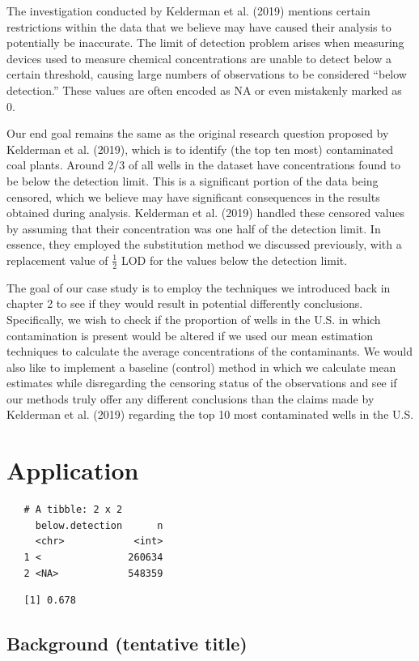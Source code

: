 \documentclass[12pt, twoside]{amherstthesis}
\begin{document}
The investigation conducted by Kelderman et al. (2019) mentions certain restrictions within the data that we believe may have caused their analysis to potentially be inaccurate. The limit of detection problem arises when measuring devices used to measure chemical concentrations are unable to detect below a certain threshold, causing large numbers of observations to be considered ``below detection.'' These values are often encoded as NA or even mistakenly marked as 0.

Our end goal remains the same as the original research question proposed by Kelderman et al. (2019), which is to identify (the top ten most) contaminated coal plants. Around 2/3 of all wells in the dataset have concentrations found to be below the detection limit. This is a significant portion of the data being censored, which we believe may have significant consequences in the results obtained during analysis. Kelderman et al. (2019) handled these censored values by assuming that their concentration was one half of the detection limit. In essence, they employed the substitution method we discussed previously, with a replacement value of \(\frac{1}{2}\) LOD for the values below the detection limit.

The goal of our case study is to employ the techniques we introduced back in chapter 2 to see if they would result in potential differently conclusions. Specifically, we wish to check if the proportion of wells in the U.S. in which contamination is present would be altered if we used our mean estimation techniques to calculate the average concentrations of the contaminants. We would also like to implement a baseline (control) method in which we calculate mean estimates while disregarding the censoring status of the observations and see if our methods truly offer any different conclusions than the claims made by Kelderman et al. (2019) regarding the top 10 most contaminated wells in the U.S.

\hypertarget{application}{%
\section{Application}\label{application}}
\begin{verbatim}
   # A tibble: 2 x 2
     below.detection      n
     <chr>            <int>
   1 <               260634
   2 <NA>            548359
\end{verbatim}
\begin{verbatim}
   [1] 0.678
\end{verbatim}
\hypertarget{background-tentative-title}{%
\subsection{Background (tentative title)}\label{background-tentative-title}}
\end{document}
